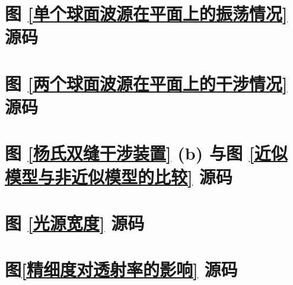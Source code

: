 \documentclass[UTF8]{report}
\theoremstyle{MyLineTheoremStyle} %
\theoremstyle{MyBlockTheoremStyle} %
\theoremstyle{MySubsubsectionStyle} %
\begin{document}
\section{图 \ref{单个球面波源在平面上的振荡情况} 源码}
\label{单个球面波源在平面上的振荡情况 源码}


\section{图 \ref{两个球面波源在平面上的干涉情况} 源码}
\label{两个球面波源在平面上的干涉情况 源码}



\section{图 \ref{杨氏双缝干涉装置} (b) 与图 \ref{近似模型与非近似模型的比较} 源码}\label{杨氏双缝干涉装置 源码}


\section{图 \ref{光源宽度} 源码}
\label{光源宽度 源码}


\section{图\ref{精细度对透射率的影响} 源码}
\label{精细度对透射率的影响 源码}


\end{document}
